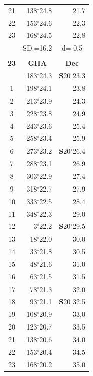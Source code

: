 \documentclass[10pt, a4paper]{report}
\begin{document}
\begin{scriptsize}
\begin{tabular*}{0.2\textwidth}[t]{@{\extracolsep{\fill}}|c|rr|}
21 & 138$^\circ$24.8 & \raisebox{0.24ex}{\boldmath$\cdot$~\boldmath$\cdot$~~}21.7\\
22 & 153$^\circ$24.6 & 22.3\\
23 & 168$^\circ$24.5 & 22.8\\
\hline
\rule{0pt}{2.4ex} & \multicolumn{1}{c}{SD.=16.2} & \multicolumn{1}{c|}{d=-0.5}\\
\hline
\multicolumn{1}{c}{}\\[-0.5ex]\hline
\multicolumn{1}{|c|}{\rule{0pt}{2.6ex}\textbf{23}} & \multicolumn{1}{c}{\textbf{GHA}} & \multicolumn{1}{c|}{\textbf{Dec}}\\
\hline\rule{0pt}{2.6ex}\noindent
0 & 183$^\circ$24.3 & \textbf{S}20$^\circ$23.3\\
1 & 198$^\circ$24.1 & 23.8\\
2 & 213$^\circ$23.9 & 24.3\\
3 & 228$^\circ$23.8 & \raisebox{0.24ex}{\boldmath$\cdot$~\boldmath$\cdot$~~}24.9\\
4 & 243$^\circ$23.6 & 25.4\\
5 & 258$^\circ$23.4 & 25.9\\[2Pt]
6 & 273$^\circ$23.2 & \textbf{S}20$^\circ$26.4\\
7 & 288$^\circ$23.1 & 26.9\\
8 & 303$^\circ$22.9 & 27.4\\
9 & 318$^\circ$22.7 & \raisebox{0.24ex}{\boldmath$\cdot$~\boldmath$\cdot$~~}27.9\\
10 & 333$^\circ$22.5 & 28.4\\
11 & 348$^\circ$22.3 & 29.0\\[2Pt]
12 & 3$^\circ$22.2 & \textbf{S}20$^\circ$29.5\\
13 & 18$^\circ$22.0 & 30.0\\
14 & 33$^\circ$21.8 & 30.5\\
15 & 48$^\circ$21.6 & \raisebox{0.24ex}{\boldmath$\cdot$~\boldmath$\cdot$~~}31.0\\
16 & 63$^\circ$21.5 & 31.5\\
17 & 78$^\circ$21.3 & 32.0\\[2Pt]
18 & 93$^\circ$21.1 & \textbf{S}20$^\circ$32.5\\
19 & 108$^\circ$20.9 & 33.0\\
20 & 123$^\circ$20.7 & 33.5\\
21 & 138$^\circ$20.6 & \raisebox{0.24ex}{\boldmath$\cdot$~\boldmath$\cdot$~~}34.0\\
22 & 153$^\circ$20.4 & 34.5\\
23 & 168$^\circ$20.2 & 35.0\\

\end{tabular*}
\end{scriptsize}
\end{document}
